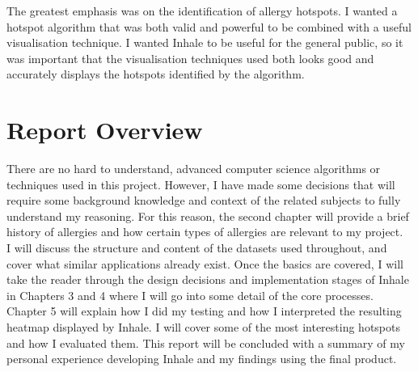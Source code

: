 The greatest emphasis was on the identification of allergy hotspots. I wanted a hotspot algorithm that was both valid and  powerful to be combined with a useful visualisation technique. I wanted Inhale to be useful for the general public, so it was important that the visualisation techniques used both looks good and accurately displays the hotspots identified by the algorithm.\\


\section{Report Overview}

There are no hard to understand, advanced computer science algorithms or techniques used in this project. However, I have made some decisions that will require some background knowledge and context of the related subjects to fully understand my reasoning. For this reason, the second chapter will provide a brief history of allergies and how certain types of allergies are relevant to my project.\\

I will discuss the structure and content of the datasets used throughout, and cover what similar applications already exist. Once the basics are covered, I will take the reader through the design decisions and implementation stages of Inhale in Chapters 3 and 4 where I will go into some detail of the core processes.\\

Chapter 5 will explain how I did my testing and how I interpreted the resulting heatmap displayed by Inhale. I will cover some of the most interesting hotspots and how I evaluated them. This report will be concluded with a summary of my personal experience developing Inhale and my findings using the final product.\\